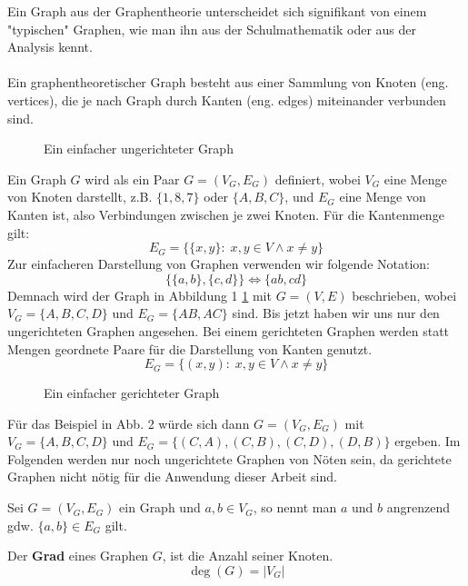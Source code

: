 Ein Graph aus der Graphentheorie unterscheidet sich signifikant von einem "typischen" Graphen, wie man ihn aus der Schulmathematik oder aus der Analysis kennt.\\\\
Ein graphentheoretischer Graph besteht aus einer Sammlung von Knoten (eng. vertices), die je nach Graph durch Kanten (eng. edges) miteinander verbunden sind.
\begin{figure}[h]
    \centering
    
    \caption{Ein einfacher ungerichteter Graph}
    \label{g1}
\end{figure}
Ein Graph $G$ wird als ein Paar $G=(V_G,E_G)$ definiert, wobei \(V_G\) eine Menge von Knoten darstellt, z.B. \(\{1, 8, 7\}\) oder \(\{A, B, C\}\), und \(E_G\) eine Menge von Kanten ist, also Verbindungen zwischen je zwei Knoten. Für die Kantenmenge gilt:
$$E_G = \{\{x, y\} \colon \; x,y \in V \wedge x \neq y \}$$
Zur einfacheren Darstellung von Graphen verwenden wir folgende Notation:
$$\{\{a, b\}, \{c, d\}\} \Leftrightarrow \{ab, cd\}$$
Demnach wird der Graph in Abbildung 1 \ref{g1} mit \(G=(V,E)\) beschrieben, wobei \(V_G=\{A,B,C,D\}\) und \(E_G=\{AB,AC\}\) sind. 
\newpage
Bis jetzt haben wir uns nur den ungerichteten Graphen angesehen. Bei einem gerichteten Graphen werden statt Mengen geordnete Paare für die Darstellung von Kanten genutzt. 
$$E_G = \{(x, y) \colon \; x,y \in V \wedge x \neq y \}$$
\begin{figure}[h]
    \centering
    
    \caption{Ein einfacher gerichteter Graph}
\end{figure}
Für das Beispiel in Abb. 2 würde sich dann $G=(V_G, E_G)$ mit $V_G=\{A,B,C,D\}$ und $E_G=\{(C,A), (C,B), (C,D), (D,B)\}$ ergeben. Im Folgenden werden nur noch ungerichtete Graphen von Nöten sein, da gerichtete Graphen nicht nötig für die Anwendung dieser Arbeit sind. 
\begin{definition}
    Sei $G=(V_G, E_G)$ ein Graph und $a, b \in V_G$, so nennt man $a$ und $b$ angrenzend gdw. $\{a,b\} \in E_G$ gilt.
\end{definition}
\begin{definition}
    Der \textbf{Grad} eines Graphen $G$, ist die Anzahl seiner Knoten. 
    $$\deg(G)=|V_G|$$
\end{definition}
